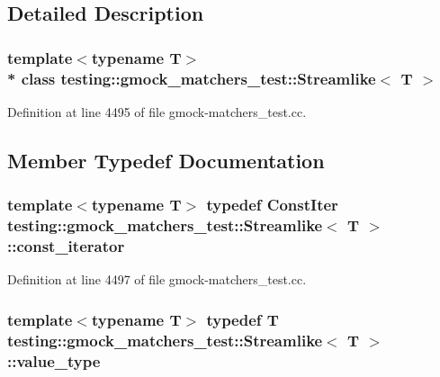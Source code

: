 \subsection{Detailed Description}
\subsubsection*{template$<$typename T$>$\\*
class testing\+::gmock\+\_\+matchers\+\_\+test\+::\+Streamlike$<$ T $>$}



Definition at line 4495 of file gmock-\/matchers\+\_\+test.\+cc.



\subsection{Member Typedef Documentation}
\subsubsection[{\texorpdfstring{const\+\_\+iterator}{const_iterator}}]{\setlength{\rightskip}{0pt plus 5cm}template$<$typename T$>$ typedef Const\+Iter {\bf testing\+::gmock\+\_\+matchers\+\_\+test\+::\+Streamlike}$<$ {\bf T} $>$\+::{\bf const\+\_\+iterator}}\hypertarget{classtesting_1_1gmock__matchers__test_1_1_streamlike_a2eeb61dca56f70d0266f5f8ae91d2c7b}{}\label{classtesting_1_1gmock__matchers__test_1_1_streamlike_a2eeb61dca56f70d0266f5f8ae91d2c7b}


Definition at line 4497 of file gmock-\/matchers\+\_\+test.\+cc.

\subsubsection[{\texorpdfstring{value\+\_\+type}{value_type}}]{\setlength{\rightskip}{0pt plus 5cm}template$<$typename T$>$ typedef {\bf T} {\bf testing\+::gmock\+\_\+matchers\+\_\+test\+::\+Streamlike}$<$ {\bf T} $>$\+::{\bf value\+\_\+type}}\hypertarget{classtesting_1_1gmock__matchers__test_1_1_streamlike_a7e2c2e021676c1ed5dea63cdd019661c}{}\label{classtesting_1_1gmock__matchers__test_1_1_streamlike_a7e2c2e021676c1ed5dea63cdd019661c}



